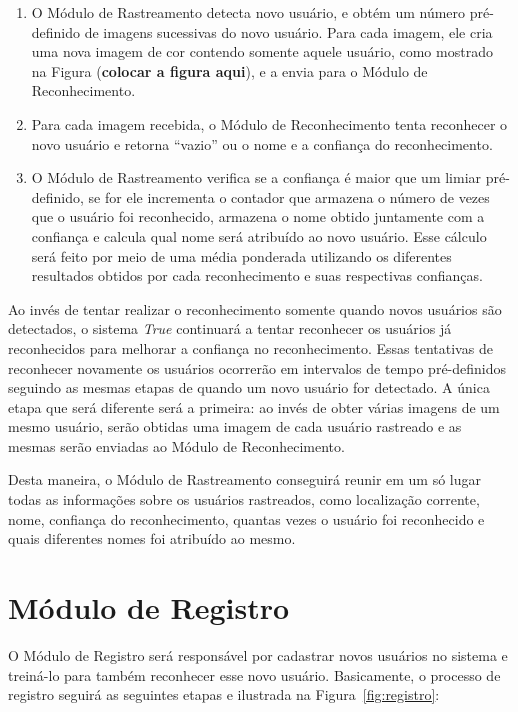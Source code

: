 		\begin{enumerate}
		 	\item O Módulo de Rastreamento detecta novo usuário, e obtém um número pré-definido de imagens sucessivas do novo usuário. Para cada imagem, ele cria uma nova imagem de cor contendo somente aquele usuário, como mostrado na Figura (\textbf{colocar a figura aqui}), e a envia para o Módulo de Reconhecimento.
		 	\item Para cada imagem recebida, o Módulo de Reconhecimento tenta reconhecer o novo usuário e retorna ``vazio'' ou o nome e a confiança do reconhecimento.
		 	\item O Módulo de Rastreamento verifica se a confiança é maior que um limiar pré-definido, se for ele incrementa o contador que armazena o número de vezes que o usuário foi reconhecido, armazena o nome obtido juntamente com a confiança e calcula qual nome  será atribuído ao novo usuário. Esse cálculo será feito por meio de uma média ponderada utilizando os diferentes resultados obtidos por cada reconhecimento e suas respectivas confianças.
	 	\end{enumerate} 
	
	Ao invés de tentar realizar o reconhecimento somente quando novos usuários são detectados, o sistema \textit{True} continuará a tentar reconhecer os usuários já reconhecidos para melhorar a confiança no reconhecimento. Essas tentativas de reconhecer novamente os usuários ocorrerão em intervalos de tempo pré-definidos seguindo as mesmas etapas de quando um novo usuário for detectado. A única etapa que será diferente será a primeira: ao invés de obter várias imagens de um mesmo usuário, serão obtidas uma imagem de cada usuário rastreado e as mesmas serão enviadas ao Módulo de Reconhecimento.

	Desta maneira, o Módulo de Rastreamento conseguirá reunir em um só lugar todas as informações sobre os usuários rastreados, como localização corrente, nome, confiança do reconhecimento, quantas vezes o usuário foi reconhecido e quais diferentes nomes foi atribuído ao mesmo.

\section{Módulo de Registro}

	O Módulo de Registro será responsável por cadastrar novos usuários no sistema e treiná-lo para também reconhecer esse novo usuário. Basicamente, o processo de registro seguirá as seguintes etapas e ilustrada na Figura~\ref{fig:registro}:

